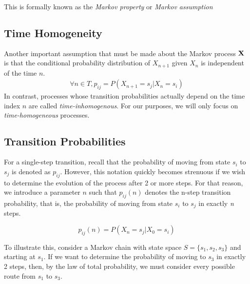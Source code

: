 \documentclass[a4paper,12pt]{article}
\theoremstyle{definition}
\let\oldtextbf\mathbf
\renewcommand{\mathbf}[1]{\oldtextbf{\boldmath #1}}
\begin{document}
	This is formally known as the \emph{Markov property} or \emph{Markov assumption}
	
\subsection*{Time Homogeneity}
	
	Another important assumption that must be made about the Markov process $\mathbf{X}$ is that the conditional probability 
	distribution of $X_{n+1}$ given $X_n$ is independent of the time $n$.
	\begin{equation*}
		\begin{aligned}
			\forall n\in T, p_{ij} = P(X_{n+1} = s_j | X_{n} = s_i)
		\end{aligned}
	\end{equation*}
	In contrast, processes whose transition probabilities actually depend on the time index $n$ are called \emph{time-inhomogenous}.
	For our purposes, we will only focus on \emph{time-homogeneous} processes.
	
\subsection*{Transition Probabilities}
	
	For a single-step transition, recall that the probability of moving from state $s_i$ to $s_j$ is denoted as $p_{ij}$. 
	However, this notation quickly becomes strenuous if we wish to determine the evolution of the process after 2 or more
	 steps. For that reason, we introduce a parameter $n$ such that $p_{ij}(n)$ denotes the n-step transition 
	 probability, that is, the probability of moving from state $s_i$ to $s_j$ in exactly \emph{n} steps. 
		
	\[p_{ij}(n) = P(X_{n} = s_j | X_{0} = s_i)\]
	
	To illustrate this, consider a Markov chain with state space $S = \{s_1, s_2, s_3\}$ and starting at $s_1$. If we want 
	to determine the probability of moving to $s_3$ in exactly 2 steps, then, by the law of total probability, we must consider 
	every possible route from $s_1$ to $s_3$.
\end{document}
